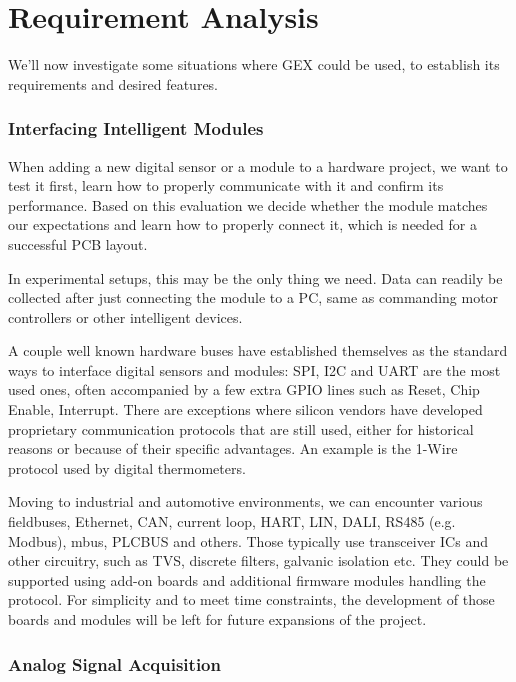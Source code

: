 \chapter{Requirement Analysis}

We'll now investigate some situations where GEX could be used, to establish its requirements and desired features. 

\subsection{Interfacing Intelligent Modules}\label{sec:uses-digital-ifaces}

When adding a new digital sensor or a module to a hardware project, we want to test it first, learn how to properly communicate with it and confirm its performance. Based on this evaluation we decide whether the module matches our expectations and learn how to properly connect it, which is needed for a successful PCB layout.

In experimental setups, this may be the only thing we need. Data can readily be collected after just connecting the module to a PC, same as commanding motor controllers or other intelligent devices.

A couple well known hardware buses have established themselves as the standard ways to interface digital sensors and modules: SPI, I2C and UART are the most used ones, often accompanied by a few extra GPIO lines such as Reset, Chip Enable, Interrupt. There are exceptions where silicon vendors have developed proprietary communication protocols that are still used, either for historical reasons or because of their specific advantages. An example is the 1-Wire protocol used by digital thermometers.

Moving to industrial and automotive environments, we can encounter various fieldbuses, Ethernet, CAN, current loop, HART, LIN, DALI, RS485 (e.g. Modbus), mbus, PLCBUS and others. Those typically use transceiver ICs and other circuitry, such as TVS, discrete filters, galvanic isolation etc. They could be supported using add-on boards and additional firmware modules handling the protocol. For simplicity and to meet time constraints, the development of those boards and modules will be left for future expansions of the project.

\subsection{Analog Signal Acquisition}

